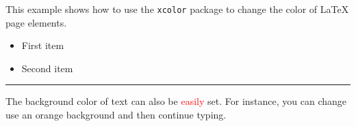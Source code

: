 \documentclass{article}
\begin{document}
	This example shows how to use the \texttt{xcolor} package 
	to change the color of \LaTeX{} page elements.
	
	\begin{itemize}
		\color{ForestGreen}
		\item First item
		\item Second item
	\end{itemize}
	
	\noindent
	{\color{RubineRed} \rule{\linewidth}{0.5mm}}
	
	The background color of text can also be \textcolor{red}{easily} set. For 
	instance, you can change use an \colorbox{BurntOrange}{orange background} and then continue typing.
\end{document}
